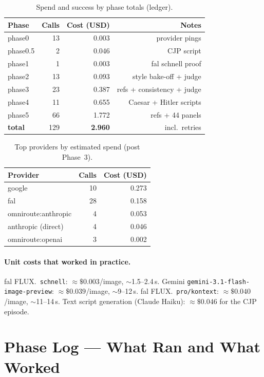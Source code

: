 \documentclass[10pt,twocolumn,letterpaper]{article}
\begin{document}
\begin{table}[t]
\centering
\caption{Spend and success by phase totals (ledger).}
\label{tab:cat}
\small
\begin{tabular}{@{}lrrr@{}}
\toprule
Phase & Calls & Cost (USD) & Notes \\
\midrule
phase0   & 13 & 0.003 & provider pings \\
phase0.5 &  2 & 0.046 & CJP script \\
phase1   &  1 & 0.003 & fal schnell proof \\
phase2   & 13 & 0.093 & style bake-off + judge \\
phase3   & 23 & 0.387 & refs + consistency + judge \\
phase4   & 11 & 0.655 & Caesar + Hitler scripts \\
phase5   & 66 & 1.772 & refs + 44 panels \\
\midrule
\textbf{total} & 129 & \textbf{2.960} & incl.\ retries \\
\bottomrule
\end{tabular}
\end{table}

\begin{table}[t]
\centering
\caption{Top providers by estimated spend (post Phase~3).}
\label{tab:prov}
\small
\begin{tabular}{@{}lrr@{}}
\toprule
Provider & Calls & Cost (USD) \\
\midrule
google & 10 & 0.273 \\
fal & 28 & 0.158 \\
omniroute:anthropic & 4 & 0.053 \\
anthropic (direct) & 4 & 0.046 \\
omniroute:openai & 3 & 0.002 \\
\bottomrule
\end{tabular}
\end{table}

\paragraph{Unit costs that worked in practice.}
fal FLUX.~\texttt{schnell}: \textbf{$\approx\$0.003$}/image, $\sim$1.5--2.4\,s.
Gemini \texttt{gemini-3.1-flash-image-preview}: \textbf{$\approx\$0.039$}/image, $\sim$9--12\,s.
fal FLUX.~\texttt{pro/kontext}: \textbf{$\approx\$0.040$}/image, $\sim$11--14\,s.
Text script generation (Claude Haiku): \textbf{$\approx\$0.046$} for the CJP episode.

\section{Phase Log --- What Ran and What Worked}
\end{document}
